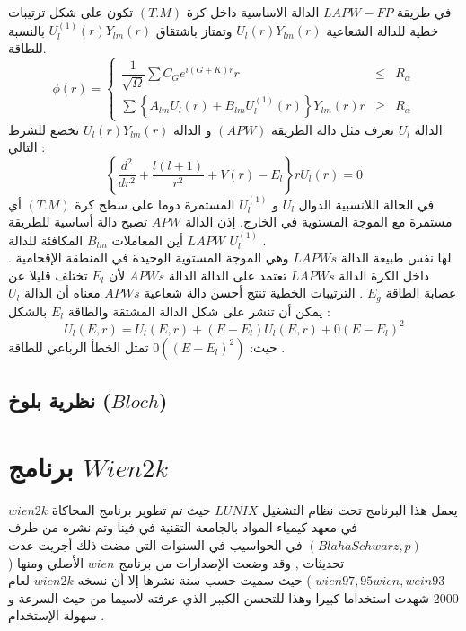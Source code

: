 في طريقة $ LAPW-FP  $ الدالة الاساسية داخل كرة $ (T.M) $ تكون على شكل ترتيبات خطية للدالة الشعاعية $  U_{l} (r) Y_{lm} (r) $ وتمتاز باشتقاق $  U_{l}^{(1)} (r) Y_{lm} (r) $ بالنسبة للطاقة.
\begin{equation}\label{key}
	\phi(r) = \left\{\begin{array}{rcl} 
		\dfrac{1}{\sqrt\Omega} \sum C_{G} e^{i(G+K)r}    r & \leq & R_{\alpha}\\
		\sum \left\{A_{lm} U_{l}(r) + B_{lm} U_{l}^{(1)} (r)  \right\} Y_{lm} (r)    r & \geq & R_{\alpha}
	\end{array} \right.
\end{equation}
الدالة $ U_{l} $ تعرف مثل دالة الطريقة $ ( APW ) $ و الدالة $  U_{l} (r) Y_{lm} (r) $ تخضع للشرط التالي :
\begin{equation}\label{}
	\left\{\frac{d^{2}}{dr^{2}} + \dfrac{l(l+1)}{r^{2}} + V(r) - E_{l} \right\} r U_{l} (r) = 0 
\end{equation}
في الحالة اللانسبية الدوال $ U_{l} $ و $ U_{l}^{(1)} $ المستمرة دوما على سطح كرة $ (T.M) $ أي مستمرة مع الموجة المستوية في الخارج. إذن  الدالة $ APW  $ تصبح دالة أساسية للطريقة  $ LAPW $ أين المعاملات $ B_{lm} $ المكافئة للدالة $ U_{l}^{(1)} $ .\\
لها نفس طبيعة الدالة $ LAPWs  $ وهي الموجة المستوية الوحيدة في المنطقة الإقحامية . داخل الكرة الدالة $ LAPWs $ تعتمد على الدالة الدالة $ APWs  $ لأن  $ E_{l} $ تختلف قليلا عن عصابة الطاقة $ E_{g} $ . الترتيبات الخطية تنتج أحسن دالة شعاعية $ APWs $ معناه أن الدالة $ U_{l} $ يمكن أن تنشر على شكل الدالة المشتقة والطاقة $ E_{l} $ بالشكل :
\begin{equation}\label{}
	U_{l}(E,r) = U_{l}(E,r) + (E - E_{l}) U_{l} (E,r) + 0 (E - E_{l})^{2}
\end{equation}
حيث: $ 0((E - E_{l})^{2}) $ تمثل الخطأ الرباعي للطاقة . \cite{b5}

\subsection{ نظرية بلوخ ($ Bloch $) }


\section{ برنامج $ Wien2k $ }

يعمل هذا البرنامج تحت نظام التشغيل $ LUNIX  $ حيث تم  تطوير برنامج المحاكاة  $ wien2k   $ في معهد كيمياء المواد بالجامعة التقنية في فينا وتم  نشره من طرف $ ( Blaha Schwarz,p ) $ في الحواسيب في السنوات التي مضت ذلك أجريت عدت تحديثات , وقد وضعت الإصدارات من برنامج $ wien  $ الأصلي ومنها ( $ wien97 , 95 wien, wein93 $ ) حيث سميت حسب سنة نشرها إلا أن نسخه  $ wien2k $ لعام  2000 شهدت استخداما كبيرا وهذا للتحسن الكيبر الذي عرفته لاسيما من حيث السرعة و سهولة الإستخدام .\cite{b1}

